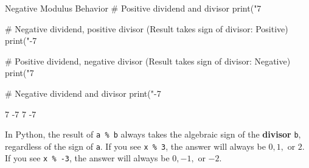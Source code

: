 \begin{pythoncode}{Negative Modulus Behavior}
# Positive dividend and divisor
print("7 %

# Negative dividend, positive divisor (Result takes sign of divisor: Positive)
print("-7 %

# Positive dividend, negative divisor (Result takes sign of divisor: Negative)
print("7 %

# Negative dividend and divisor
print("-7 %
\end{pythoncode}

\begin{outputbox}
7 %
-7 %
7 %
-7 %
\end{outputbox}

\begin{examtip}
In Python, the result of \texttt{a \% b} always takes the algebraic sign of the \textbf{divisor} \texttt{b}, regardless of the sign of \texttt{a}. If you see \texttt{x \% 3}, the answer will always be $0, 1,$ or $2$. If you see \texttt{x \% -3}, the answer will always be $0, -1,$ or $-2$.
\end{examtip}

